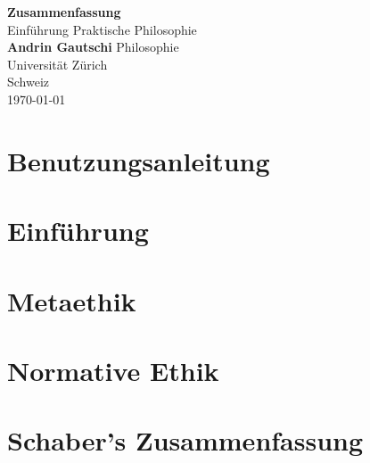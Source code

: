 \documentclass[12pt]{report}
\begin{document}
\begin{titlepage}
	\begin{center}
        \vspace*{9cm}
        \Huge\textbf{Zusammenfassung}\\
        \vspace{0.5cm}
        \LARGE Einführung Praktische Philosophie   
        \vspace{2cm}\\
        \textbf{Andrin Gautschi}
        \vfill
        \Large
        Philosophie\\
        Universität Zürich\\
        Schweiz\\
        \today
    \end{center}
\end{titlepage}


\tableofcontents
\newpage

\chapter{Benutzungsanleitung}


\chapter{Einführung}


\chapter{Metaethik}


\chapter{Normative Ethik}


%

\chapter{Schaber's Zusammenfassung}

\end{document}
